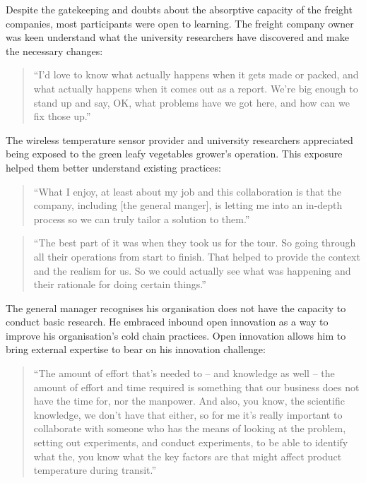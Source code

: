 Despite the gatekeeping and doubts about the absorptive capacity of the freight companies, most participants were open to learning. The freight company owner was keen understand what the university researchers have discovered and make the necessary changes:

\begin{quote}
\small
\enquote{I'd love to know what actually happens when it gets made or packed, and what actually happens when it comes out as a report. We're big enough to stand up and say, OK, what problems have we got here, and how can we fix those up.} \\
\end{quote}

The wireless temperature sensor provider and university researchers appreciated being exposed to the green leafy vegetables grower's operation. This exposure helped them better understand existing practices:

\begin{quote}
\small
\enquote{What I enjoy, at least about my job and this collaboration is that the company, including [the general manger], is letting me into an in-depth process so we can truly tailor a solution to them.} \\
\end{quote}

\begin{quote}
\small
\enquote{The best part of it was when they took us for the tour. So going through all their operations from start to finish. That helped to provide the context and the realism for us. So we could actually see what was happening and their rationale for doing certain things.} \\
\end{quote}

The general manager recognises his organisation does not have the capacity to conduct basic research. He embraced inbound open innovation as a way to improve his organisation's cold chain practices. Open innovation allows him to bring external expertise to bear on his innovation challenge:

\begin{quote}
\small
\enquote{The amount of effort that's needed to – and knowledge as well – the amount of effort and time required is something that our business does not have the time for, nor the manpower. And also, you know, the scientific knowledge, we don't have that either, so for me it's really important to collaborate with someone who has the means of looking at the problem, setting out experiments, and conduct experiments, to be able to identify what the, you know what the key factors are that might affect product temperature during transit.} \\
\end{quote}

